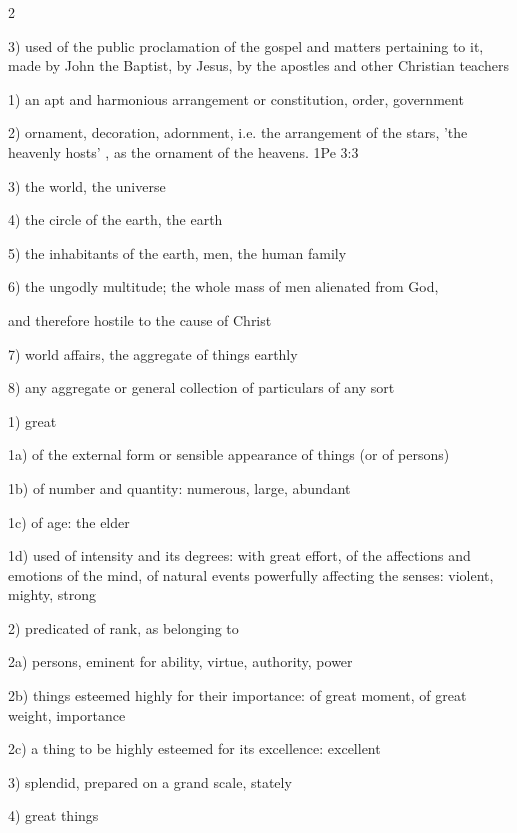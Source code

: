 \documentclass[letterpaper]{article}
\begin{document}
\begin{multicols}{2}
\begin{description}
3) used of the public proclamation of the gospel and matters
pertaining to it, made by John the Baptist, by Jesus, by the
apostles and other Christian teachers



\item[2889: ]



1) an apt and harmonious arrangement or constitution, order,
government

2) ornament, decoration, adornment, i.e. the arrangement of the stars,
'the heavenly hosts' , as the ornament of the heavens. 1Pe 3:3

3) the world, the universe

4) the circle of the earth, the earth

5) the inhabitants of the earth, men, the human family

6) the ungodly multitude; the whole mass of men alienated from God,

and therefore hostile to the cause of Christ

7) world affairs, the aggregate of things earthly

8) any aggregate or general collection of particulars of any sort



\item[3173: ]



1) great

1a) of the external form or sensible appearance of things (or
of persons)

1b) of number and quantity: numerous, large, abundant

1c) of age: the elder

1d) used of intensity and its degrees: with great effort, of
the affections and emotions of the mind, of natural events
powerfully affecting the senses: violent, mighty, strong

2) predicated of rank, as belonging to

2a) persons, eminent for ability, virtue, authority, power

2b) things esteemed highly for their importance: of great
moment, of great weight, importance

2c) a thing to be highly esteemed for its excellence: excellent

3) splendid, prepared on a grand scale, stately

4) great things




\end{description}
\end{multicols}
\end{document}
